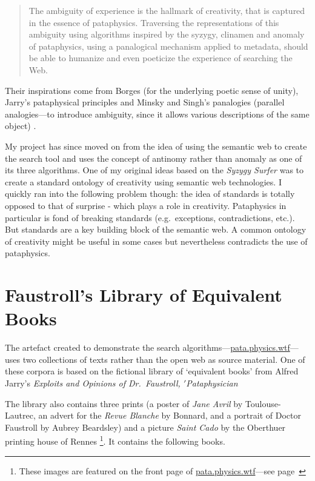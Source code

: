 \begin{quotation}
  The ambiguity of experience is the hallmark of creativity, that is captured in the essence of pataphysics. Traversing the representations of this ambiguity using algorithms inspired by the syzygy, clinamen and anomaly of pataphysics, using a panalogical mechanism applied to metadata, should be able to humanize and even poeticize the experience of searching the Web. 
\end{quotation}

Their inspirations come from Borges \autocite*{Borges2000} (for the underlying poetic sense of unity), Jarry's pataphysical principles \autocite*{Jarry1996} and Minsky and Singh's panalogies (parallel analogies---to introduce ambiguity, since it allows various descriptions of the same object) \autocite*{Singh2005}.

\spirals

My project has since moved on from the idea of using the semantic web to create the search tool and uses the concept of antinomy rather than anomaly as one of its three algorithms. One of my original ideas based on the \textit{Syzygy Surfer} was to create a standard ontology of creativity using semantic web technologies. I quickly ran into the following problem though: the idea of standards is totally opposed to that of surprise - which plays a role in creativity. Pataphysics in particular is fond of breaking standards (e.g.\ exceptions, contradictions, etc.). But standards are a key building block of the semantic web. A common ontology of creativity might be useful in some cases but nevertheless contradicts the use of pataphysics.


\section{Faustroll's Library of Equivalent Books}
\label{s:faustlib}

The artefact created to demonstrate the search algorithms---\url{pata.physics.wtf}---uses two collections of texts rather than the open web as source material. One of these corpora is based on the fictional library of `equivalent books' from Alfred Jarry's \textit{Exploits and Opinions of Dr.\ Faustroll, $'$Pataphysician} \citeyear{Jarry1996}

The library also contains three prints (a poster of \textit{Jane Avril} by Toulouse-Lautrec, an advert for the \textit{Revue Blanche} by Bonnard, and a portrait of Doctor Faustroll by Aubrey Beardsley) and a picture \textit{Saint Cado} by the Oberthuer printing house of Rennes \autocite{Jarry1996}\footnote{These images are featured on the front page of \url{pata.physics.wtf}---see page~\pageref{img:fullscreenshot}}. It contains the following books.

